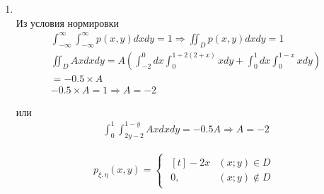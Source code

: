 \documentclass[12pt]{article}
\begin{document}
\begin{enumerate}
	\item \mbox{}\\
	      Из условия нормировки
	      \begin{gather*}
		      \int_{-\infty}^{\infty}\int_{-\infty}^{\infty}p(x,y)dxdy = 1 \Rightarrow \iint_{D}p(x,y)dxdy = 1 \\
		      \iint_{D}Axdxdy =
		      A\left(\int_{-2}^{0}dx\int_{0}^{1\div2(2 + x)}xdy + \int_{0}^{1}dx\int_{0}^{1 - x}xdy \right) \\
		      = -0.5 \times A \\
		      -0.5 \times A = 1 \Rightarrow A = -2
	      \end{gather*}

	      или
	      \begin{gather*}
		      \int_{0}^{1}\int_{2y-2}^{1-y} Ax dxdy = -0.5A \Rightarrow A = -2
	      \end{gather*}

	      \begin{gather*}
		      p_{\xi,\eta}(x,y) =
		      \begin{cases}
			      \begin{aligned}[t]
				      -2x & (x;y) \in D    \\
				      0,  & (x;y) \notin D
			      \end{aligned}
		      \end{cases}
	      \end{gather*}


\end{enumerate}
\end{document}
